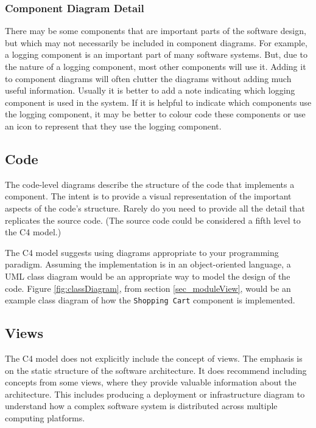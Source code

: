 \subsubsection{Component Diagram Detail}
There may be some components that are important parts of the software design, but which may not necessarily be included in component diagrams.
For example, a logging component is an important part of many software systems.
But, due to the nature of a logging component, most other components will use it.
Adding it to component diagrams will often clutter the diagrams without adding much useful information.
Usually it is better to add a note indicating which logging component is used in the system.
If it is helpful to indicate which components use the logging component,
it may be better to colour code these components or use an icon to represent that they use the logging component.

\subsection{Code}
The code-level diagrams describe the structure of the code that implements a component.
The intent is to provide a visual representation of the important aspects of the code's structure.
Rarely do you need to provide all the detail that replicates the source code.
(The source code could be considered a fifth level to the C4 model.)

The C4 model suggests using diagrams appropriate to your programming paradigm.
Assuming the implementation is in an object-oriented language, a UML class diagram would be an appropriate way to model the design of the code.
Figure \ref{fig:classDiagram}, from section \ref{sec_moduleView},
would be an example class diagram of how the \texttt{Shopping Cart} component is implemented.

\subsection{Views}
The C4 model does not explicitly include the concept of views.
The emphasis is on the static structure of the software architecture.
It does recommend including concepts from some views, where they provide valuable information about the architecture.
This includes producing a deployment or infrastructure diagram to understand how a complex software system is distributed across multiple computing platforms.

